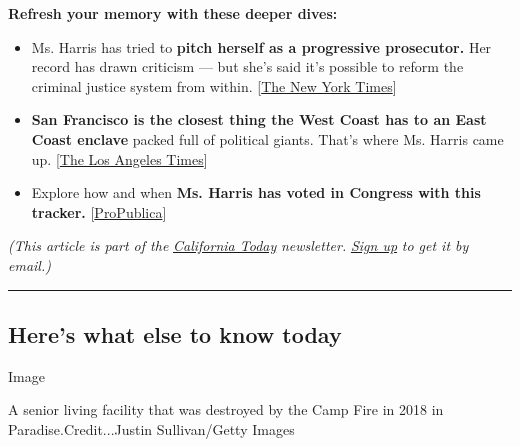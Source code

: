 \textbf{Refresh your memory with these deeper dives:}

\begin{itemize}
\item
  Ms. Harris has tried to \textbf{pitch herself as a progressive
  prosecutor.} Her record has drawn criticism --- but she's said it's
  possible to reform the criminal justice system from within.
  {[}\href{https://www.nytimes3xbfgragh.onion/2019/02/11/us/kamala-harris-progressive-prosecutor.html}{The
  New York Times}{]}
\item
  \textbf{San Francisco is the closest thing the West Coast has to an
  East Coast enclave} packed full of political giants. That's where Ms.
  Harris came up.
  {[}\href{https://www.latimes.com/local/politics/la-me-pol-california-politics-20150125-story.html}{The
  Los Angeles Times}{]}
\item
  Explore how and when \textbf{Ms. Harris has voted in Congress with
  this tracker.}
  {[}\href{https://projects.propublica.org/represent/members/H001075-kamala-harris?m}{ProPublica}{]}
\end{itemize}

\emph{(This article is part of the}
\href{https://www.nytimes3xbfgragh.onion/column/california-today}{\emph{California
Today}} \emph{newsletter.}
\href{https://www.nytimes3xbfgragh.onion/newsletters/california-today}{\emph{Sign
up}} \emph{to get it by email.)}

\begin{center}\rule{0.5\linewidth}{\linethickness}\end{center}

\hypertarget{heres-what-else-to-know-today}{%
\subsection{Here's what else to know
today}\label{heres-what-else-to-know-today}}

Image

A senior living facility that was destroyed by the Camp Fire in 2018 in
Paradise.Credit...Justin Sullivan/Getty Images

